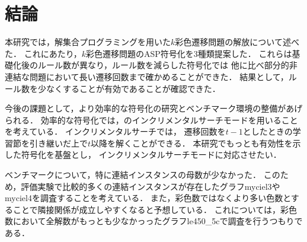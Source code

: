 \chapter{結論} \label{chap:conclusion}
本研究では，解集合プログラミングを用いた$k$彩色遷移問題の解放について述べた．
これにあたり，$k$彩色遷移問題のASP符号化を3種類提案した．
これらは基礎化後のルール数が異なり，ルール数を減らした符号化では
他に比べ部分的非連結な問題において長い遷移回数まで確かめることができた．
結果として，ルール数を少なくすることが有効であることが確認できた．

今後の課題として，より効率的な符号化の研究とベンチマーク環境の整備があげられる．
効率的な符号化では，{\clingo}のインクリメンタルサーチモードを用いることを考えている．
インクリメンタルサーチでは，
遷移回数を$t-1$としたときの学習節を引き継いだ上で$t$以降を解くことができる．
本研究でもっとも有効性を示した符号化を基盤とし，
インクリメンタルサーチモードに対応させたい．

ベンチマークについて，特に連結インスタンスの母数が少なかった．
このため，評価実験で比較的多くの連結インスタンスが存在したグラフmyciel3やmyciel4を調査することを考えている．
また，彩色数ではなくより多い色数とすることで隣接関係が成立しやすくなると予想している．
これについては，彩色数において全解数がもっとも少なかっったグラフle450\_5cで調査を行うつもりである．


